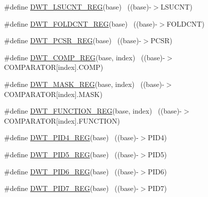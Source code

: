 \begin{DoxyCompactItemize}
\item 
\#define \hyperlink{group___d_w_t___register___accessor___macros_ga1b22a818a9d093362624b64053cd8b6d}{D\+W\+T\+\_\+\+L\+S\+U\+C\+N\+T\+\_\+\+R\+EG}(base)                                      ~((base)-\/$>$L\+S\+U\+C\+NT)
\item 
\#define \hyperlink{group___d_w_t___register___accessor___macros_gaeb8e407cb620f678d367fae5467d486a}{D\+W\+T\+\_\+\+F\+O\+L\+D\+C\+N\+T\+\_\+\+R\+EG}(base)                                    ~((base)-\/$>$F\+O\+L\+D\+C\+NT)
\item 
\#define \hyperlink{group___d_w_t___register___accessor___macros_ga19fcf102babeb34ec17bc96dd4d08e52}{D\+W\+T\+\_\+\+P\+C\+S\+R\+\_\+\+R\+EG}(base)                                          ~((base)-\/$>$P\+C\+SR)
\item 
\#define \hyperlink{group___d_w_t___register___accessor___macros_gad03eebac5bf5c3c3e461e156ba6e37ae}{D\+W\+T\+\_\+\+C\+O\+M\+P\+\_\+\+R\+EG}(base,  index)                              ~((base)-\/$>$C\+O\+M\+P\+A\+R\+A\+T\+OR\mbox{[}index\mbox{]}.C\+O\+MP)
\item 
\#define \hyperlink{group___d_w_t___register___accessor___macros_ga16461875f56f3b91ee27a53a9f4dbc78}{D\+W\+T\+\_\+\+M\+A\+S\+K\+\_\+\+R\+EG}(base,  index)                              ~((base)-\/$>$C\+O\+M\+P\+A\+R\+A\+T\+OR\mbox{[}index\mbox{]}.M\+A\+SK)
\item 
\#define \hyperlink{group___d_w_t___register___accessor___macros_gaedc0f311fdf85789a988b58375481265}{D\+W\+T\+\_\+\+F\+U\+N\+C\+T\+I\+O\+N\+\_\+\+R\+EG}(base,  index)                      ~((base)-\/$>$C\+O\+M\+P\+A\+R\+A\+T\+OR\mbox{[}index\mbox{]}.F\+U\+N\+C\+T\+I\+ON)
\item 
\#define \hyperlink{group___d_w_t___register___accessor___macros_gafdad2b8a5caa1715b1d7fbe6850c324d}{D\+W\+T\+\_\+\+P\+I\+D4\+\_\+\+R\+EG}(base)                                          ~((base)-\/$>$P\+I\+D4)
\item 
\#define \hyperlink{group___d_w_t___register___accessor___macros_gad638e97562bc8fa280d32b7869c712d1}{D\+W\+T\+\_\+\+P\+I\+D5\+\_\+\+R\+EG}(base)                                          ~((base)-\/$>$P\+I\+D5)
\item 
\#define \hyperlink{group___d_w_t___register___accessor___macros_gaa7f5da9ec68998f6952de46154855328}{D\+W\+T\+\_\+\+P\+I\+D6\+\_\+\+R\+EG}(base)                                          ~((base)-\/$>$P\+I\+D6)
\item 
\#define \hyperlink{group___d_w_t___register___accessor___macros_ga5dac20d58b3ff153ca8aa07e73990545}{D\+W\+T\+\_\+\+P\+I\+D7\+\_\+\+R\+EG}(base)                                          ~((base)-\/$>$P\+I\+D7)

\end{DoxyCompactItemize}
